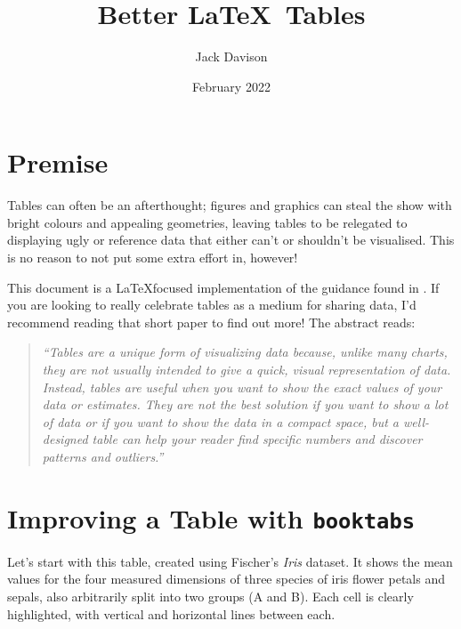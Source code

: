 \documentclass{article}
\title{Better \LaTeX~Tables}
\author{Jack Davison}
\date{February 2022}
\begin{document}
\maketitle

\tableofcontents

\section{Premise}

Tables can often be an afterthought; figures and graphics can steal the show with bright colours and appealing geometries, leaving tables to be relegated to displaying ugly or reference data that either can't or shouldn't be visualised. This is no reason to not put some extra effort in, however!

This document is a \LaTeX focused implementation of the guidance found in \citet{schwabish_2020}. If you are looking to really celebrate tables as a medium for sharing data, I'd recommend reading that short paper to find out more! The abstract reads:

\begin{quote}
\textit{``Tables are a unique form of visualizing data because, unlike many charts, they are not usually intended to give a quick, visual representation of data. Instead, tables are useful when you want to show the exact values of your data or estimates. They are not the best solution if you want to show a lot of data or if you want to show the data in a compact space, but a well-designed table can help your reader find specific numbers and discover patterns and outliers.''
}\end{quote}



\newpage
\section{Improving a Table with \texttt{booktabs}}

Let's start with this table, created using Fischer's \textit{Iris} dataset. It shows the mean values for the four measured dimensions of three species of iris flower petals and sepals, also arbitrarily split into two groups (A and B). Each cell is clearly highlighted, with vertical and horizontal lines between each.
\end{document}
